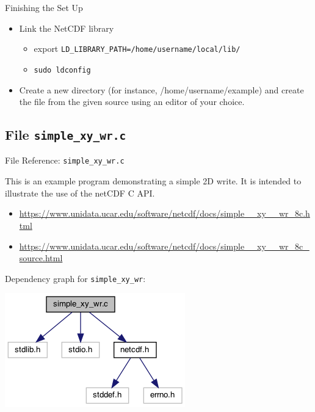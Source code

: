 \documentclass[compress,11pt,xcolor=svgnames,aspectratio=169]{beamer}
\begin{document}
\begin{frame}[fragile]{Finishing the Set Up}

\begin{itemize}
\setlength\itemsep{0.8cm}
  \item Link the NetCDF library\\
  \begin{itemize}
  \setlength\itemsep{0.2cm}
    \item export \verb|LD_LIBRARY_PATH=/home/username/local/lib/|
    \item \verb|sudo ldconfig|
  \end{itemize}
  \item Create a new directory (for instance, /home/username/example) and create the file from the given source using an editor of your choice.

\end{itemize}

\end{frame}

\subsection{File \texttt{simple\_xy\_wr.c}}


\begin{frame}[fragile]{File Reference: \texttt{simple\_xy\_wr.c}}

This is an example program demonstrating a simple 2D write. It is intended to illustrate the use of the netCDF C API.\\[0.3cm]

\begin{itemize}
  \item {\tiny \url{https://www.unidata.ucar.edu/software/netcdf/docs/simple__xy__wr_8c.html}}\\[0.3cm]
  \item {\tiny \url{https://www.unidata.ucar.edu/software/netcdf/docs/simple__xy__wr_8c_source.html}}\\[0.4cm]
\end{itemize}

Dependency graph for \verb|simple_xy_wr|:

\begin{center}
\includegraphics[scale=0.5]{fig/simple__xy__wr_8c__incl}
\end{center}

\end{frame}
\end{document}
